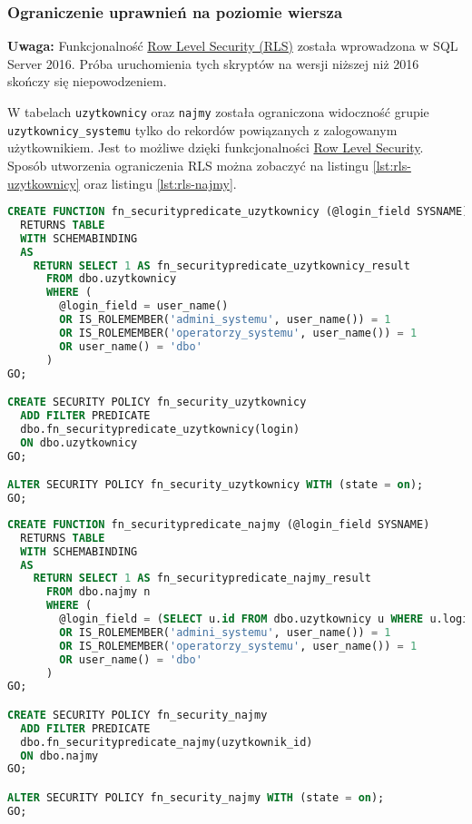 \subsubsection{Ograniczenie uprawnień na poziomie wiersza}

\textbf{Uwaga:} Funkcjonalność \href{https://docs.microsoft.com/en-us/sql/relational-databases/security/row-level-security?view=sql-server-2017}{Row Level Security (RLS)} została wprowadzona w SQL Server 2016. Próba uruchomienia tych skryptów na wersji niższej niż 2016 skończy się niepowodzeniem.

W tabelach \texttt{uzytkownicy} oraz \texttt{najmy} została ograniczona widoczność grupie \texttt{uzytkownicy\_systemu} tylko do rekordów powiązanych z zalogowanym użytkownikiem. Jest to możliwe dzięki funkcjonalności \href{https://docs.microsoft.com/en-us/sql/relational-databases/security/row-level-security?view=sql-server-2017}{Row Level Security}. Sposób utworzenia ograniczenia RLS można zobaczyć na listingu \ref{lst:rls-uzytkownicy} oraz listingu \ref{lst:rls-najmy}.

\begin{lstlisting}[language=SQL, caption={Skrypt ustawiający ograniczenie RLS na tabeli \texttt{uzytkownicy}}, label={lst:rls-uzytkownicy}]
CREATE FUNCTION fn_securitypredicate_uzytkownicy (@login_field SYSNAME)
  RETURNS TABLE
  WITH SCHEMABINDING
  AS
    RETURN SELECT 1 AS fn_securitypredicate_uzytkownicy_result
      FROM dbo.uzytkownicy
      WHERE (
        @login_field = user_name()
        OR IS_ROLEMEMBER('admini_systemu', user_name()) = 1
        OR IS_ROLEMEMBER('operatorzy_systemu', user_name()) = 1
        OR user_name() = 'dbo'
      )
GO;

CREATE SECURITY POLICY fn_security_uzytkownicy
  ADD FILTER PREDICATE
  dbo.fn_securitypredicate_uzytkownicy(login)
  ON dbo.uzytkownicy
GO;

ALTER SECURITY POLICY fn_security_uzytkownicy WITH (state = on);
GO;
\end{lstlisting}

\begin{lstlisting}[language=SQL, caption={Skrypt ustawiający ograniczenie RLS na tabeli \texttt{najmy}}, label={lst:rls-najmy}]
CREATE FUNCTION fn_securitypredicate_najmy (@login_field SYSNAME)
  RETURNS TABLE
  WITH SCHEMABINDING
  AS
    RETURN SELECT 1 AS fn_securitypredicate_najmy_result
      FROM dbo.najmy n
      WHERE (
        @login_field = (SELECT u.id FROM dbo.uzytkownicy u WHERE u.login COLLATE SQL_Latin1_General_CP1_CS_AS = CURRENT_USER COLLATE SQL_Latin1_General_CP1_CS_AS)
        OR IS_ROLEMEMBER('admini_systemu', user_name()) = 1
        OR IS_ROLEMEMBER('operatorzy_systemu', user_name()) = 1
        OR user_name() = 'dbo'
      )
GO;

CREATE SECURITY POLICY fn_security_najmy
  ADD FILTER PREDICATE
  dbo.fn_securitypredicate_najmy(uzytkownik_id)
  ON dbo.najmy
GO;

ALTER SECURITY POLICY fn_security_najmy WITH (state = on);
GO;
\end{lstlisting}

